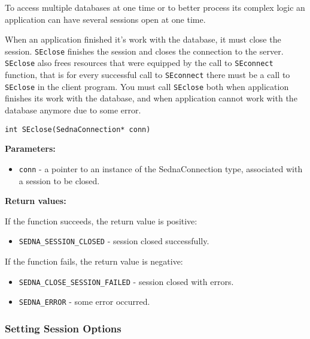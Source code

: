 \documentclass[a4paper,12pt]{article}
\newenvironment{citemize}
{\begin{itemize}
  \setlength{\itemsep}{0pt}
  \setlength{\parskip}{0pt}
  \setlength{\parsep}{0pt}}
{\end{itemize}}
\begin{document}
To access multiple databases at one time or to better process its complex logic
an application can have several sessions open at one time.

When an application finished it's work with the database, it must close the
session. \verb!SEclose! finishes the session and closes the connection to the
server. \verb!SEclose! also frees resources that were equipped by the call to
\verb!SEconnect! function, that is for every successful call to \verb!SEconnect!
there must be a call to \verb!SEclose! in the client program. You must call
\verb!SEclose! both when application finishes its work with the database, and
when application cannot work with the database anymore due to some error.

\begin{verbatim}
int SEclose(SednaConnection* conn)
\end{verbatim}

\noindent
\textbf{Parameters:}

\begin{citemize}
\item\verb!conn! - a pointer to an instance of the SednaConnection type,
associated with a session to be closed.
\end{citemize}

\noindent
\textbf{Return values:}

\medskip

\noindent
If the function succeeds, the return value is positive:

\begin{citemize}
\item\verb!SEDNA_SESSION_CLOSED! - session closed successfully.
\end{citemize}

\noindent
If the function fails, the return value is negative:

\begin{citemize}
\item\verb!SEDNA_CLOSE_SESSION_FAILED! - session closed with errors.
\item\verb!SEDNA_ERROR! - some error occurred.
\end{citemize}


\subsubsection{Setting Session Options}
\label{session-option-capi}
\end{document}
